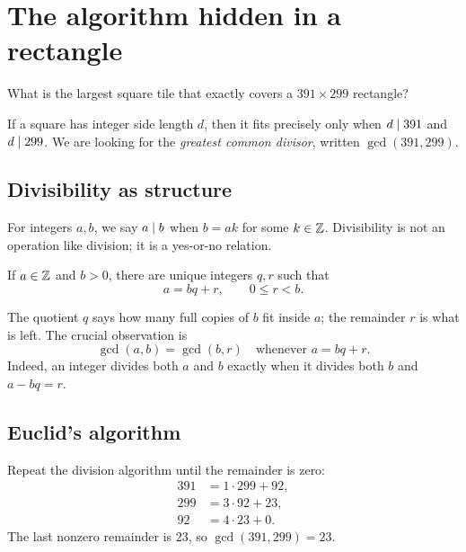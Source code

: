 \chapter{The algorithm hidden in a rectangle}

\begin{question}
What is the largest square tile that exactly covers a $391\times299$ rectangle?
\end{question}

If a square has integer side length $d$, then it fits precisely only when $d\mid391$ and $d\mid299$. We are looking for the \emph{greatest common divisor}, written $\gcd(391,299)$.

\section{Divisibility as structure}

For integers $a,b$, we say $a\mid b$ when $b=ak$ for some $k\in\mathbb Z$. Divisibility is not an operation like division; it is a yes-or-no relation.

\begin{proposition}
If $a\in\mathbb Z$ and $b>0$, there are unique integers $q,r$ such that
\[
a=bq+r,\qquad 0\le r<b.
\]
\end{proposition}

The quotient $q$ says how many full copies of $b$ fit inside $a$; the remainder $r$ is what is left. The crucial observation is
\[
\gcd(a,b)=\gcd(b,r)\quad\text{whenever }a=bq+r.
\]
Indeed, an integer divides both $a$ and $b$ exactly when it divides both $b$ and $a-bq=r$.

\section{Euclid's algorithm}

Repeat the division algorithm until the remainder is zero:
\begin{align*}
391&=1\cdot299+92,\\
299&=3\cdot92+23,\\
92&=4\cdot23+0.
\end{align*}
The last nonzero remainder is $23$, so $\gcd(391,299)=23$.

